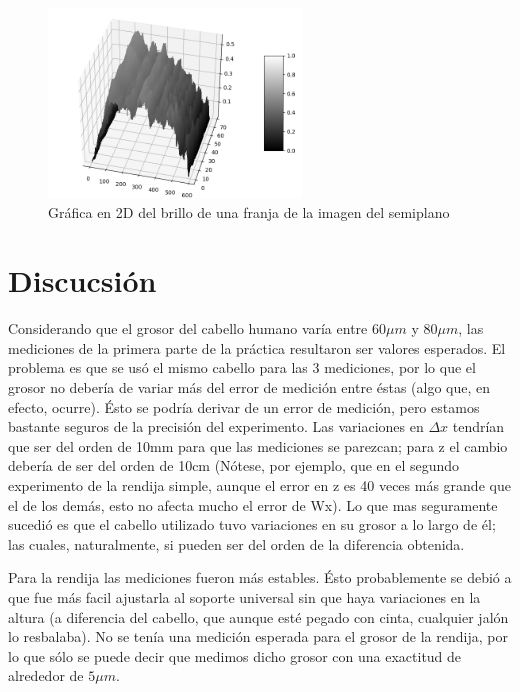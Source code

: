 \documentclass[12p]{article}
\begin{document}
\begin{figure}[h]
  \includegraphics[width=0.6\textwidth]{sp_2D.png}
  \centering
  \caption{Gráfica en 2D del brillo de una franja de la imagen del semiplano}
\end{figure} 

\section{Discucsión}
Considerando que el grosor del cabello humano varía entre $60\mu m$ y $80\mu m$, las mediciones de la primera parte de la práctica resultaron ser valores esperados. El problema es que se usó el mismo cabello para las 3 mediciones, por lo que el grosor no debería de variar más del error de medición entre éstas (algo que, en efecto, ocurre). Ésto se podría derivar de un error de medición, pero estamos bastante seguros de la precisión del experimento. Las variaciones en $\Delta x$ tendrían que ser del orden de 10mm para que las mediciones se parezcan; para z el cambio debería de ser del orden de 10cm (Nótese, por ejemplo, que en el segundo experimento de la rendija simple, aunque el error en z es 40 veces más grande que el de los demás, esto no afecta mucho el error de Wx). Lo que mas seguramente sucedió es que el cabello utilizado tuvo variaciones en su grosor a lo largo de él; las cuales, naturalmente, si pueden ser del orden de la diferencia obtenida.

Para la rendija las mediciones fueron más estables. Ésto probablemente se debió a que fue más facil ajustarla al soporte universal sin que haya variaciones en la altura (a diferencia del cabello, que aunque esté pegado con cinta, cualquier jalón lo resbalaba). No se tenía una medición esperada para el grosor de la rendija, por lo que sólo se puede decir que medimos dicho grosor con una exactitud de alrededor de $5\mu m$.
\end{document}
